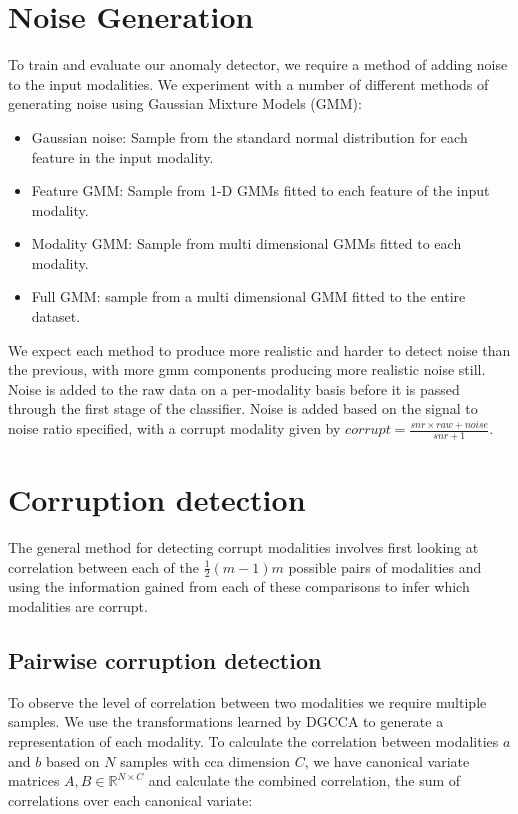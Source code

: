\section{Noise Generation}
To train and evaluate our anomaly detector, we require a method of adding noise to the input modalities. We experiment with a number of different methods of generating noise using Gaussian Mixture Models (GMM):
\begin{itemize}
    \item Gaussian noise: Sample from the standard normal distribution for each feature in the input modality.
    \item Feature GMM: Sample from 1-D GMMs fitted to each feature of the input modality.
    \item Modality GMM: Sample from multi dimensional GMMs fitted to each modality.
    \item Full GMM: sample from a multi dimensional GMM fitted to the entire dataset.
\end{itemize}
We expect each method to produce more realistic and harder to detect noise than the previous, with more gmm components producing more realistic noise still. Noise is added to the raw data on a per-modality basis before it is passed through the first stage of the classifier. Noise is added based on the signal to noise ratio specified, with a corrupt modality given by $corrupt = \frac{snr\times raw + noise}{snr + 1}$.


\section{Corruption detection}
The general method for detecting corrupt modalities involves first looking at correlation between each of the $\frac{1}{2}(m-1)m$ possible pairs of modalities and using the information gained from each of these comparisons to infer which modalities are corrupt.

\subsection{Pairwise corruption detection}
To observe the level of correlation between two modalities we require multiple samples. We use the transformations learned by DGCCA to generate a representation of each modality. To calculate the correlation between modalities $a$ and $b$ based on $N$ samples with cca dimension $C$, we have canonical variate matrices $A, B \in \mathbb{R}^{N\times C}$ and calculate the combined correlation, the sum of correlations over each canonical variate:

